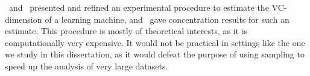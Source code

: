 \citet{VapnikLLC94}~and~\citet{ShaoCL00} presented and refined an experimental
procedure to estimate the VC-dimension of a learning machine,
and~\citet{McDonaldSS11} gave concentration results for such an estimate. This
procedure is mostly of theoretical interests, as it is computationally very
expensive. It would not be practical in settings like the one we study in this
dissertation, as it would defeat the purpose of using sampling to speed up the
analysis of very large datasets.

